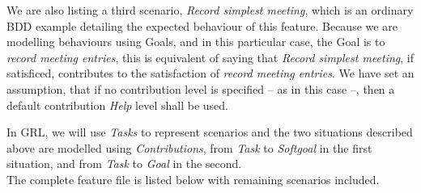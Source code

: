 \documentclass[dissertation,final]{softeng}
\begin{document}
We are also listing a third scenario, \emph{Record simplest meeting}, which is an ordinary BDD example detailing the expected behaviour of this feature. Because we are modelling behaviours using Goals, and in this particular case, the Goal is to \emph{record meeting entries}, this is equivalent of saying that \emph{Record simplest meeting}, if satisficed, contributes to the satisfaction of \emph{record meeting entries}. We have set an assumption, that if no contribution level is specified -- as in this case --, then a default contribution \emph{Help} level shall be used.

In GRL, we will use \emph{Tasks} to represent scenarios and the two situations described above are modelled using \emph{Contributions}, from \emph{Task} to \emph{Softgoal} in the first situation, and from \emph{Task} to \emph{Goal} in the second.\\

The complete feature file is listed below with remaining scenarios included.
\end{document}
